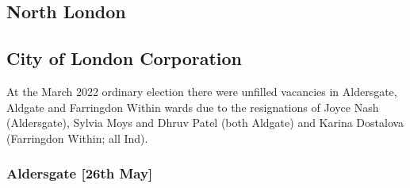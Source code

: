 \documentclass[a4paper,openany]{book}
\begin{document}
\begin{resultsiii}

%
%
%
%
%

\section{North London}

\subsection*{City of London Corporation}

At the March 2022 ordinary election there were unfilled vacancies in Aldersgate, Aldgate and Farringdon Within wards due to the resignations of Joyce Nash (Aldersgate), Sylvia Moys and Dhruv Patel (both Aldgate) and Karina Dostalova (Farringdon Within; all Ind).%
%
%

\subsubsection*{Aldersgate \hspace*{\fill}\nolinebreak[1]%
	\enspace\hspace*{\fill}
	[26th May]}



\end{resultsiii}
\end{document}
